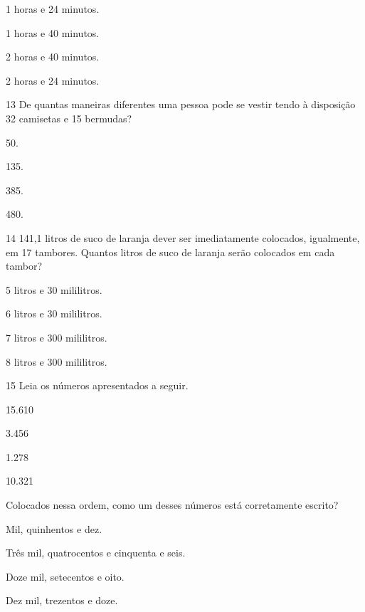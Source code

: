 \begin{escolha}
\item
  1 horas e 24 minutos.
\item
  1 horas e 40 minutos.
\item
  2 horas e 40 minutos.
\item
  2 horas e 24 minutos.
\end{escolha}


\num{13} De quantas maneiras diferentes uma pessoa pode se vestir tendo à
disposição 32 camisetas e 15 bermudas?

\begin{escolha}
\item
  50.
\item
  135.
\item
  385.
\item
  480.
\end{escolha}


\num{14} 141,1 litros de suco de laranja dever ser imediatamente colocados,
igualmente, em 17 tambores. Quantos litros de suco de laranja serão
colocados em cada tambor?

\begin{escolha}
\item
  5 litros e 30 mililitros.
\item
  6 litros e 30 mililitros.
\item
  7 litros e 300 mililitros.
\item
  8 litros e 300 mililitros.
\end{escolha}


\pagebreak
\num{15} Leia os números apresentados a seguir.

\begin{center}
\begin{mdframed}[linewidth=2pt,linecolor=azul!20,backgroundcolor=azul!20,roundcorner=2pt]
15.610

3.456

1.278

10.321
\end{mdframed}
\end{center}

Colocados nessa ordem, como um desses números está corretamente escrito?

\begin{escolha}
\item Mil, quinhentos e dez.

\item Três mil, quatrocentos e cinquenta e seis.

\item Doze mil, setecentos e oito.

\item Dez mil, trezentos e doze.
\end{escolha}

